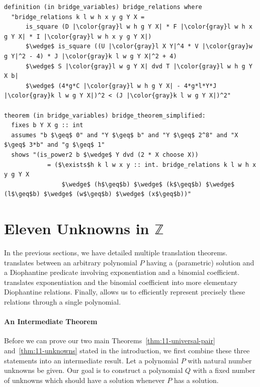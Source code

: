 \documentclass[a4paper,USenglish,cleveref,autoref,thm-restate]{lipics-v2021}
\newcommand{\Z}{{\mathbb Z}}
\begin{document}
\begin{lstlisting}[escapechar={|}]
definition (in bridge_variables) bridge_relations where
  "bridge_relations k l w h x y g Y X =
      is_square (D |\color{gray}l w h g Y X| * F |\color{gray}l w h x g Y X| * I |\color{gray}l w h x y g Y X|)
      $\wedge$ is_square ((U |\color{gray}l X Y|^4 * V |\color{gray}w g Y|^2 - 4) * J |\color{gray}k l w g Y X|^2 + 4)
      $\wedge$ S |\color{gray}l w g Y X| dvd T |\color{gray}l w h g Y X b|
      $\wedge$ (4*g*C |\color{gray}l w h g Y X| - 4*g*l*Y*J |\color{gray}k l w g Y X|)^2 < (J |\color{gray}k l w g Y X|)^2"

theorem (in bridge_variables) bridge_theorem_simplified:
  fixes b Y X g :: int
  assumes "b $\geq$ 0" and "Y $\geq$ b" and "Y $\geq$ 2^8" and "X $\geq$ 3*b" and "g $\geq$ 1"
  shows "(is_power2 b $\wedge$ Y dvd (2 * X choose X))
            = ($\exists$h k l w x y :: int. bridge_relations k l w h x y g Y X
                $\wedge$ (h$\geq$b) $\wedge$ (k$\geq$b) $\wedge$ (l$\geq$b) $\wedge$ (w$\geq$b) $\wedge$ (x$\geq$b))"
\end{lstlisting}




\section{Eleven Unknowns in \texorpdfstring{$\Z$}{Z}}

In the previous sections, we have detailed multiple translation theorems.  translates between an arbitrary polynomial $P$ having a (parametric) solution and a Diophantine predicate involving exponentiation and a binomial coefficient.  translates exponentiation and the binomial coefficient into more elementary Diophantine relations. Finally,  allows us to efficiently represent precisely these relations through a single polynomial. 

\paragraph*{An Intermediate Theorem}
Before we can prove our two main Theorems~\ref{thm:11-universal-pair} and~\ref{thm:11-unknowns} stated in the introduction, we first combine these three statements into an intermediate result. Let a polynomial $P$ with natural number unknowns be given. Our goal is to construct a polynomial $Q$ with a fixed number of unknowns which should have a solution whenever $P$ has a solution. 
\end{document}
